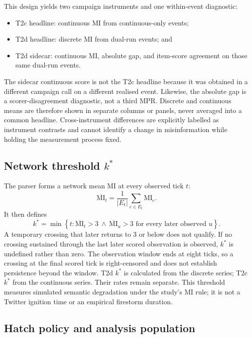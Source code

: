 This design yields two campaign instruments and one within-event diagnostic:
\begin{itemize}
  \item T2c headline: continuous MI from continuous-only events;
  \item T2d headline: discrete MI from dual-run events; and
  \item T2d sidecar: continuous MI, absolute gap, and item-score agreement on those
        same dual-run events.
\end{itemize}
The sidecar continuous score is not the T2c headline because it was obtained in a
different campaign call on a different realised event.  Likewise, the absolute gap is
a scorer-disagreement diagnostic, not a third MPR.  Discrete and continuous means are
therefore shown in separate columns or panels, never averaged into a common headline.
Cross-instrument differences are explicitly labelled as instrument contrasts and
cannot identify a change in misinformation while holding the measurement process
fixed.

\subsection{\texorpdfstring{Network threshold \(k^{*}\)}{Network threshold k*}}
\label{sec:mm-kstar}

The parser forms a network mean MI at every observed tick \(t\):
\[
  \overline{\mathrm{MI}}_t
  =\frac{1}{|E_t|}\sum_{e\in E_t}\mathrm{MI}_e.
\]
It then defines
\begin{equation}
  k^{*}
  =\min\left\{t:
       \overline{\mathrm{MI}}_t>3
       \ \land\
       \overline{\mathrm{MI}}_u>3
       \text{ for every later observed }u
     \right\}.
  \label{eq:kstar}
\end{equation}
A temporary crossing that later returns to \(3\) or below does not qualify. If no
crossing sustained through the last later scored observation is observed,
\(k^{*}\) is undefined rather than zero. The observation window ends at eight
ticks, so a crossing at the final scored tick is right-censored and does not
establish persistence beyond the window. T2d \(k^{*}\) is
calculated from the discrete series; T2c \(k^{*}\) from the continuous series.  Their
rates remain separate.  This threshold measures simulated semantic degradation under
the study's MI rule; it is not a Twitter ignition time or an empirical firestorm
duration.

\subsection{Hatch policy and analysis population}
\label{sec:mm-hatch}

